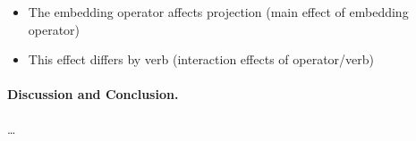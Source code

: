 \documentclass[12pt, a4paper]{scrartcl}
\begin{document}
	\begin{itemize}
		\item The embedding operator affects projection (main effect of embedding operator)
		\item This effect differs by verb (interaction effects of operator/verb)
	\end{itemize}

\paragraph{Discussion and Conclusion.} %
	\dots

\pagebreak

\end{document}
